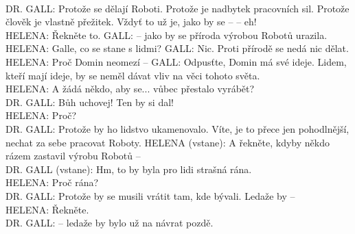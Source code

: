 \documentclass[11pt]{article}
\begin{document}
 \\ DR. GALL: Protože se dělají Roboti. Protože je nadbytek pracovních sil. Protože člověk je vlastně přežitek. Vždyť to už je, jako by se – – eh! \\ HELENA: Řekněte to.  GALL: – jako by se příroda výrobou Robotů urazila. \\ HELENA: Galle, co se stane s lidmi?  GALL: Nic. Proti přírodě se nedá nic dělat. \\ HELENA: Proč Domin neomezí –  GALL: Odpusťte, Domin má své ideje. Lidem, kteří mají ideje, by se neměl dávat vliv na věci tohoto světa. \\ HELENA: A žádá někdo, aby se... vůbec přestalo vyrábět? \\ DR. GALL: Bůh uchovej! Ten by si dal! \\ HELENA: Proč? \\ DR. GALL: Protože by ho lidstvo ukamenovalo. Víte, je to přece jen pohodlnější, nechat za sebe pracovat Roboty. HELENA  (vstane):  A  řekněte,  kdyby  někdo  rázem  zastavil  výrobu Robotů – \\ DR. GALL (vstane): Hm, to by byla pro lidi strašná rána. \\ HELENA: Proč rána? \\ DR. GALL: Protože by se musili vrátit tam, kde bývali. Ledaže by – \\ HELENA: Řekněte. \\ DR. GALL: – ledaže by bylo už na návrat pozdě. 
\end{document}
